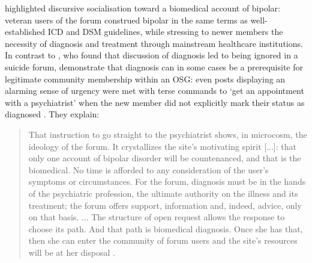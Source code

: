 \documentclass{article}
\begin{document}
\textcite[c.f. Section \ref{sect:advice}]{vayreda_social_2009} highlighted discursive socialisation toward a biomedical account of bipolar: veteran users of the forum construed bipolar in the same terms as well-established ICD and DSM guidelines, while stressing to newer members the necessity of diagnosis and treatment through mainstream healthcare institutions. In contrast to \textcite{horne_doing_2009}, who found that discussion of diagnosis led to being ignored in a suicide forum, \citeauthor{vayreda_social_2009} demonstrate that diagnosis can in some cases be a prerequisite for legitimate community membership within an OSG: even posts displaying an alarming sense of urgency were met with terse commands to `get an appointment with a psychiatrist' when the new member did not explicitly mark their status as diagnosed \parencite*[p.~940]{vayreda_social_2009}. They explain:

\begin{quote}\small\singlespacing
That instruction to go straight to the psychiatrist shows, in microcosm, the ideology of the forum. It crystallizes the site's motivating spirit [...]: that only one account of bipolar disorder will be countenanced, and that is the biomedical. No time is afforded to any consideration of the user's symptoms or circumstances. For the forum, diagnosis must be in the hands of the psychiatric profession, the ultimate authority on the illness and its treatment; the forum offers support, information and, indeed, advice, only on that basis. ... The structure of open request allows the response to choose its path. And that path is biomedical diagnosis. Once she has that, then she can enter the community of forum users and the site's resources will be at her disposal \parencite*[pp.~940--941]{vayreda_social_2009}.
\end{quote}
\end{document}
